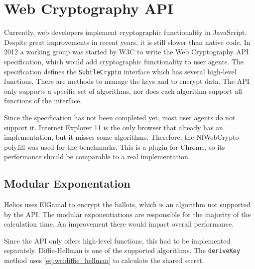 % 
%

\section{Web Cryptography API}
\label{sec:web_cryptography_api}

Currently, web developers implement cryptographic functionality in JavaScript. Despite great improvements in recent years, it is still slower than native code.\cite{site:resig_javascript_performance_rundown}\cite{site:cois_javascript_performance_rundown_2012}\cite{smedberg_performance_analysis_of_javascript} In 2012 a working group was started by W3C to write the Web Cryptography API specification, which would add cryptographic functionality to user agents.\cite{wiki:webcrypto} The specification defines the \texttt{SubtleCrypto} interface which has several high-level functions.\cite{sleevi_watson_web_cryptography_api} There are methods to manage the keys and to encrypt data. The API only supports a specific set of algorithms, nor does each algorithm support all functions of the interface.

\par Since the specification has not been completed yet, most user agents do not support it. Internet Explorer 11 is the only browser that already has an implementation, but it misses some algorithms.\cite{site:microsoft_web_cryptography} Therefore, the NfWebCrypto polyfill was used for the benchmarks. This is a \cplusplus plugin for Chrome, so its performance should be comparable to a real implementation.

\subsection{Modular Exponentation}
\label{sec:wc:modular_exponentiation}

Helios uses ElGamal to encrypt the ballots, which is an algorithm not supported by the API. The modular exponentiations are responsible for the majority of the calculation time. An improvement there would impact overall performance.

\par Since the API only offers high-level functions, this had to be implemented separately. Diffie-Hellman is one of the supported algorithms. The \texttt{deriveKey} method uses \ref{eq:wc:diffie_hellman} to calculate the shared secret.\cite{diffie_hellman_new_directions_in_cryptography}

